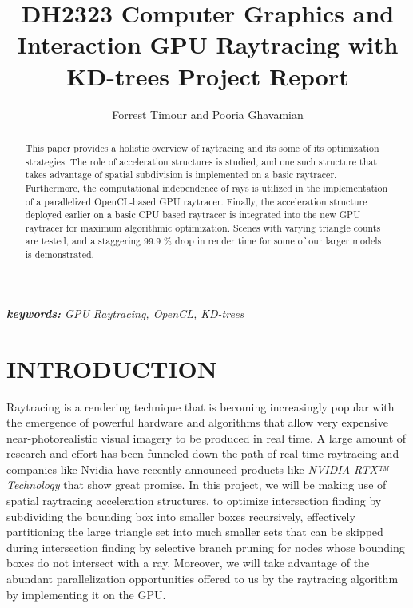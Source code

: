 \documentclass[letterpaper, 10 pt, conference]{ieeeconf}  %
\title{\LARGE \bf
DH2323 Computer Graphics and Interaction 
\linebreak GPU Raytracing with KD-trees
\linebreak Project Report
}
\author{Forrest Timour and Pooria Ghavamian} %
\begin{document}
\maketitle
\thispagestyle{empty}
\pagestyle{empty}


\begin{abstract}


This paper provides a holistic overview of raytracing and its some of its optimization strategies. The role of acceleration structures is studied, and one such structure that takes advantage of spatial subdivision is implemented on a basic raytracer. Furthermore, the computational independence of rays is utilized in the implementation of a parallelized OpenCL-based GPU raytracer. Finally, the acceleration structure deployed earlier on a basic CPU based raytracer is integrated into the new GPU raytracer for maximum algorithmic optimization. Scenes with varying triangle counts are tested, and a staggering 99.9 \% drop in render time for some of our larger models is demonstrated. 


\end{abstract}

\textit{\textbf{keywords:} GPU Raytracing, OpenCL, KD-trees } 

\section{INTRODUCTION}

Raytracing is a rendering technique that is becoming increasingly popular with the emergence of powerful hardware and algorithms that allow very expensive near-photorealistic visual imagery to be produced in real time. A large amount of research and effort has been funneled down the path of real time raytracing and companies like Nvidia have recently announced products like \textit{NVIDIA RTX™ Technology} that show great promise. In this project, we will be making use of spatial raytracing acceleration structures, to optimize intersection finding by subdividing the bounding box into smaller boxes recursively, effectively partitioning the large triangle set into much smaller sets that can be skipped during intersection finding by selective branch pruning for nodes whose bounding boxes do not intersect with a ray. Moreover, we will take advantage of the abundant parallelization opportunities offered to us by the raytracing algorithm by implementing it on the GPU.
\end{document}
